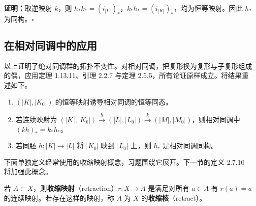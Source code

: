 \noindent\textbf{证明：}取逆映射 $k$，则 $h_*k_*=(i_{|L|})_*$，$k_*h_*=(i_{|K|})_*$，均为恒等映射。因此 $h_*$ 为同构。\hfill$\square$

\subsection*{在相对同调中的应用}
以上证明了绝对同调群的拓扑不变性。对相对同调，把复形换为复形与子复形组成的偶，应用定理 1.13.11、引理 2.2.7 与定理 2.5.5，所有论证原样成立。将结果重述如下。

\begin{enumerate}[label=(\alph*)]
\item $(|K|,|K_0|)$ 的恒等映射诱导相对同调的恒等同态。
\item 若连续映射为 $(|K|,|K_0|)\xrightarrow{h}(|L|,|L_0|)\xrightarrow{k}(|M|,|M_0|)$，则相对同调中 $(kh)_*=k_*h_*$。
\item 若同胚 $h:|K|\to|L|$ 将 $|K_0|$ 映到 $|L_0|$ 上，则 $h_*$ 是相对同调同构。
\end{enumerate}
下面单独定义经常使用的收缩映射概念，习题围绕它展开。下一节的定义 2.7.10 将加强此概念。

若 $A\subset X$，则\textbf{收缩映射}（retraction）$r:X\to A$ 是满足对所有 $a\in A$ 有 $r(a)=a$ 的连续映射。若存在这样的映射，称 $A$ 为 $X$ 的\textbf{收缩核}（retract）。

